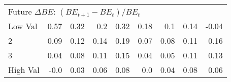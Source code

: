 \begin{table}[ht]
{\begin{tabular}{lrrrrrrrr}
    \multicolumn{9}{l}{Future $\Delta BE$: $(BE_{t+1} - BE_t) / BE_t$} \\
    Low Val    & 0.57  & 0.32  & 0.2  & 0.32  & 0.18  & 0.1  & 0.14  & -0.04  \\
           2   & 0.09  & 0.12  & 0.14  & 0.19  & 0.07  & 0.08  & 0.11  & 0.16  \\
           3   & 0.04  & 0.08  & 0.11  & 0.15  & 0.04  & 0.05  & 0.11  & 0.13  \\
    High Val   & -0.0  & 0.03  & 0.06  & 0.08  & 0.0  & 0.04  & 0.08  & 0.06  \\
    [1em]
  

  \bottomrule
\end{tabular}
}

\end{table}
